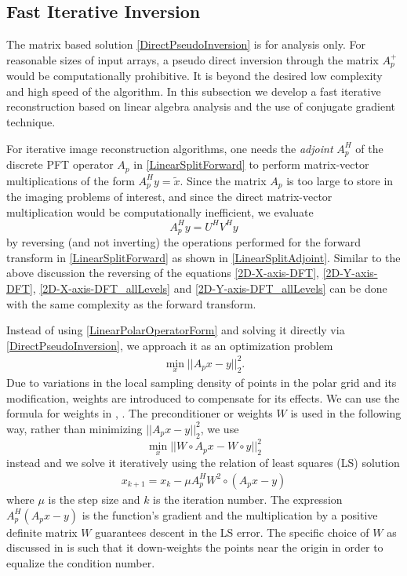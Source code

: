 \documentclass{UCF_ETD}
\begin{document}
\begin{figure}[H]
\begin{center}
 \label{PolarCornerComparisons.fig}
 \end{center}
 \end{figure}
 
 
 \subsection{Fast Iterative Inversion}\label{3C.subsec}
 The matrix based solution \eqref{DirectPseudoInversion} is for analysis only.
 For reasonable sizes of input arrays, a pseudo direct inversion through the matrix $ A^+_p$ would be computationally prohibitive. It is beyond the desired low complexity and high speed of the algorithm. In this subsection we develop a fast iterative reconstruction based on linear algebra analysis and the use of conjugate gradient technique.
 
 For iterative image reconstruction algorithms, one needs the \emph{adjoint} $A^H_p$ of the discrete PFT operator $A_p$ in \eqref{LinearSplitForward} to perform matrix-vector multiplications of the form $A^H_p y = \widetilde{x}$. Since the matrix $A_p$ is too large to store in the imaging problems of interest, and since the direct matrix-vector multiplication would be computationally inefficient, we evaluate
 $$A^H_p y = U^H V^H y$$
 by reversing (and not inverting) the operations performed for the forward transform in \eqref{LinearSplitForward} as shown in \eqref{LinearSplitAdjoint}. Similar to the above discussion the reversing of the equations  \eqref{2D-X-axis-DFT}, \eqref{2D-Y-axis-DFT}, \eqref{2D-X-axis-DFT_allLevels} and \eqref{2D-Y-axis-DFT_allLevels} can be done with the same complexity as the forward transform.
 
 Instead of using \eqref{LinearPolarOperatorForm} and solving it directly via \eqref{DirectPseudoInversion}, we approach it as an optimization problem
 \begin{eqnarray*}
 \min_x || A_p x - y ||^2_2.
 \end{eqnarray*}
 Due to variations in the local sampling density of points in the polar grid and its modification, weights are introduced to compensate for its effects. We can use the formula for weights in \cite{Amir2006}, \cite{Markus2007}. The preconditioner or weights $W$ is used in the following way, rather than minimizing $||A_p x- y||^2_2$, we use
 $$\min_x ||W\circ A_p x- W\circ y||^2_2$$
 instead and we solve it iteratively using the relation of least squares (LS) solution
 \begin{eqnarray} \label{IterativeInversionSimple}
 x_{k+1} = x_k - \mu A^H_p W^2 \circ (A_p x-y)
 \end{eqnarray}
 where $\mu$ is the step size and $k$ is the iteration number. The expression $A^H_p(A_px - y)$ is the function's gradient and the multiplication by a positive definite matrix $W$ guarantees descent in the LS error. The specific choice of $W$ as discussed in \cite{Amir2006} is such that it down-weights the points near  the origin in order to equalize the condition number.
 
\end{document}

